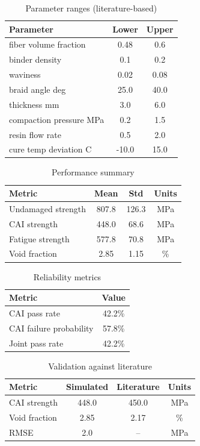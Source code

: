 \begin{table}[h]
\centering
\caption{Parameter ranges (literature-based)}
\begin{tabular}{lcc}
\hline
Parameter & Lower & Upper \\
\hline
fiber volume fraction & 0.48 & 0.6 \\
binder density & 0.1 & 0.2 \\
waviness & 0.02 & 0.08 \\
braid angle deg & 25.0 & 40.0 \\
thickness mm & 3.0 & 6.0 \\
compaction pressure MPa & 0.2 & 1.5 \\
resin flow rate & 0.5 & 2.0 \\
cure temp deviation C & -10.0 & 15.0 \\
\hline
\end{tabular}
\end{table}

\begin{table}[h]
\centering
\caption{Performance summary}
\begin{tabular}{lccc}
\hline
Metric & Mean & Std & Units \\
\hline
Undamaged strength & 807.8 & 126.3 & MPa \\
CAI strength & 448.0 & 68.6 & MPa \\
Fatigue strength & 577.8 & 70.8 & MPa \\
Void fraction & 2.85 & 1.15 & \% \\
\hline
\end{tabular}
\end{table}

\begin{table}[h]
\centering
\caption{Reliability metrics}
\begin{tabular}{lc}
\hline
Metric & Value \\
\hline
CAI pass rate & 42.2\% \\
CAI failure probability & 57.8\% \\
Joint pass rate & 42.2\% \\
\hline
\end{tabular}
\end{table}

\begin{table}[h]
\centering
\caption{Validation against literature}
\begin{tabular}{lccc}
\hline
Metric & Simulated & Literature & Units \\
\hline
CAI strength & 448.0 & 450.0 & MPa \\
Void fraction & 2.85 & 2.17 & \% \\
RMSE & 2.0 & -- & MPa \\
\hline
\end{tabular}
\end{table}
